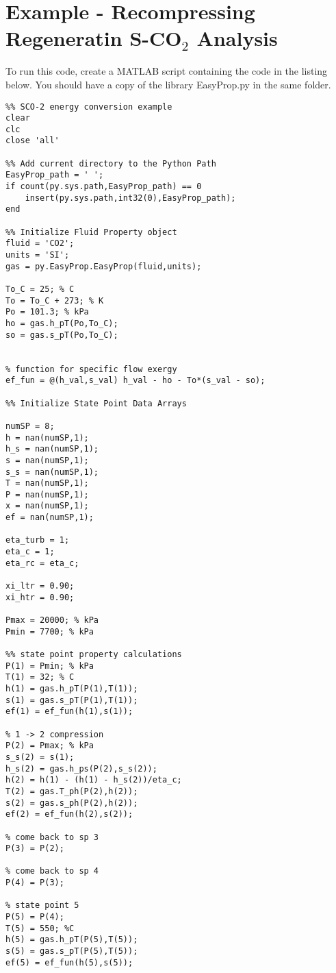 \chapter{Example - Recompressing Regeneratin S-CO$_{2}$ Analysis}
\label{app:rrsco2_ex}

To run this code, create a MATLAB script containing the code in the listing below.  You should have a copy of the library EasyProp.py in the same folder.

\begin{fullwidth}
\begin{lstlisting}
%% SCO-2 energy conversion example
clear
clc
close 'all'

%% Add current directory to the Python Path
EasyProp_path = ' '; 
if count(py.sys.path,EasyProp_path) == 0  
    insert(py.sys.path,int32(0),EasyProp_path); 
end

%% Initialize Fluid Property object
fluid = 'CO2';
units = 'SI';
gas = py.EasyProp.EasyProp(fluid,units);

To_C = 25; % C
To = To_C + 273; % K
Po = 101.3; % kPa
ho = gas.h_pT(Po,To_C);
so = gas.s_pT(Po,To_C);


% function for specific flow exergy
ef_fun = @(h_val,s_val) h_val - ho - To*(s_val - so);

%% Initialize State Point Data Arrays

numSP = 8;
h = nan(numSP,1);
h_s = nan(numSP,1);
s = nan(numSP,1);
s_s = nan(numSP,1);
T = nan(numSP,1);
P = nan(numSP,1);
x = nan(numSP,1);
ef = nan(numSP,1);

eta_turb = 1;
eta_c = 1;
eta_rc = eta_c;

xi_ltr = 0.90;
xi_htr = 0.90;

Pmax = 20000; % kPa
Pmin = 7700; % kPa

%% state point property calculations
P(1) = Pmin; % kPa
T(1) = 32; % C
h(1) = gas.h_pT(P(1),T(1));
s(1) = gas.s_pT(P(1),T(1));
ef(1) = ef_fun(h(1),s(1));

% 1 -> 2 compression
P(2) = Pmax; % kPa
s_s(2) = s(1);
h_s(2) = gas.h_ps(P(2),s_s(2));
h(2) = h(1) - (h(1) - h_s(2))/eta_c;
T(2) = gas.T_ph(P(2),h(2));
s(2) = gas.s_ph(P(2),h(2));
ef(2) = ef_fun(h(2),s(2));

% come back to sp 3
P(3) = P(2);

% come back to sp 4
P(4) = P(3);

% state point 5
P(5) = P(4);
T(5) = 550; %C
h(5) = gas.h_pT(P(5),T(5));
s(5) = gas.s_pT(P(5),T(5));
ef(5) = ef_fun(h(5),s(5));



\end{lstlisting}
\end{fullwidth}
